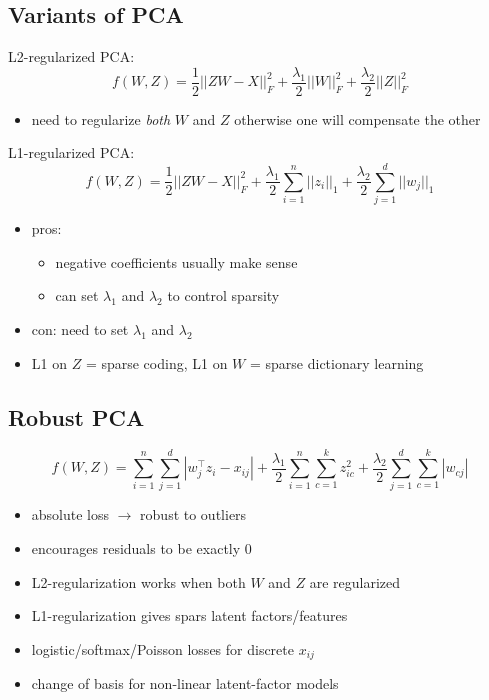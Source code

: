 \documentclass[10pt,landscape,a4paper]{article}
\begin{document}
\begin{multicols*}{5}
\subsection{Variants of PCA}
L2-regularized PCA:
\begin{dmath*}
    f(W,Z) = \frac{1}{2} ||ZW-X||_F^2 + \frac{\lambda_1}{2} ||W||_F^2 + \frac{\lambda_2}{2} ||Z||_F^2
\end{dmath*}
\begin{itemize}
    \item need to regularize \emph{both} \(W\) and \(Z\) otherwise one will compensate the other
\end{itemize}
L1-regularized PCA:
\begin{dmath*}
    f(W,Z) = \frac{1}{2} ||ZW-X||_F^2 + \frac{\lambda_1}{2} \sum_{i=1}^{n} ||z_i||_1 + \frac{\lambda_2}{2} \sum_{j=1}^{d} ||w_j||_1
\end{dmath*}
\begin{itemize}
    \item pros:
    \begin{itemize}
        \item negative coefficients usually make sense
        \item can set \(\lambda_1\) and \(\lambda_2\) to control sparsity
    \end{itemize}
    \item con: need to set \(\lambda_1\) and \(\lambda_2\)
    \item L1 on \(Z\) = sparse coding, L1 on \(W\) = sparse dictionary learning
\end{itemize}

\subsection{Robust PCA}
\begin{dmath*}
    f(W,Z) = \sum\limits_{i=1}^{n} \sum\limits_{j=1}^{d} |w_j^\intercal z_i - x_{ij}| + \frac{\lambda_1}{2} \sum\limits_{i=1}^{n} \sum\limits_{c=1}^{k} z_{ic}^2 + \frac{\lambda_2}{2} \sum\limits_{j=1}^{d} \sum\limits_{c=1}^{k} |w_{cj}|
\end{dmath*}
\begin{itemize}
    \item absolute loss \(\rightarrow \) robust to outliers
    \item encourages residuals to be exactly 0
    \item L2-regularization works when both \(W\) and \(Z\) are regularized
    \item L1-regularization gives spars latent factors/features
    \item logistic/softmax/Poisson losses for discrete \(x_{ij}\)
    \item change of basis for non-linear latent-factor models
\end{itemize}


\end{multicols*}
\end{document}
